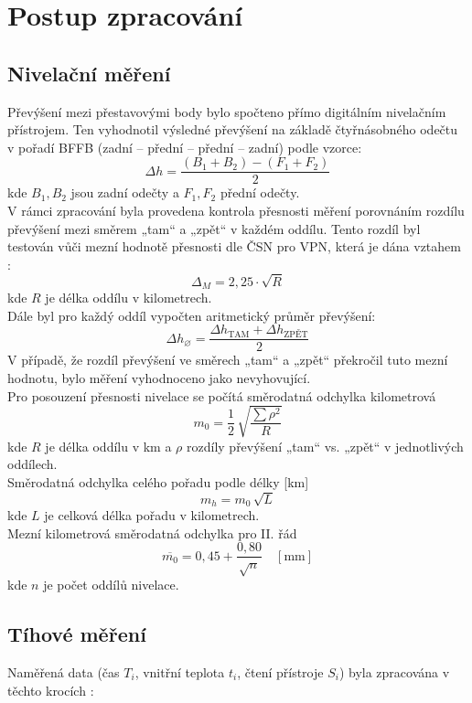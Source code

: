 \section{Postup zpracování}

\subsection{Nivelační měření}

Převýšení mezi přestavovými body bylo spočteno přímo digitálním nivelačním přístrojem. Ten vyhodnotil výsledné převýšení na základě čtyřnásobného odečtu v pořadí BFFB (zadní – přední – přední – zadní) podle vzorce:
\[
\Delta h = \frac{(B_1 + B_2) - (F_1 + F_2)}{2}
\]
kde \( B_1, B_2 \) jsou zadní odečty a \( F_1, F_2 \) přední odečty.\\
V rámci zpracování byla provedena kontrola přesnosti měření porovnáním rozdílu převýšení mezi směrem „tam“ a „zpět“ v každém oddílu. Tento rozdíl byl testován vůči mezní hodnotě přesnosti dle ČSN pro VPN, která je dána vztahem \cite{skorepa}:
\[
\Delta_M = 2,25 \cdot \sqrt{R}
\]
kde \( R \) je délka oddílu v kilometrech.\\
Dále byl pro každý oddíl vypočten aritmetický průměr převýšení:
\[
\Delta h_{\diameter} = \frac{\Delta h_{\text{TAM}} + \Delta h_{\text{ZPĚT}}}{2}
\]
V případě, že rozdíl převýšení ve směrech „tam“ a „zpět“ překročil tuto mezní hodnotu, bylo měření vyhodnoceno jako nevyhovující.\cite{zadani}\\
Pro posouzení přesnosti nivelace se počítá směrodatná odchylka kilometrová
\[
  m_0 = \frac{1}{2}\,\sqrt{\frac{\sum\rho^2}{R}}
\]
kde \( R \) je délka oddílu v km a \(\rho\) rozdíly převýšení „tam“ vs. „zpět“ v jednotlivých oddílech.\\
Směrodatná odchylka celého pořadu podle délky [km]
\[
  m_h = m_0 \,\sqrt{L}
\]
kde \(L\) je celková délka pořadu v kilometrech.\\
Mezní kilometrová směrodatná odchylka pro II. řád
\[
  \overline{m_0} = 0{,}45 + \frac{0{,}80}{\sqrt{n}}\quad [\mathrm{mm}]
\]
kde \(n\) je počet oddílů nivelace.

\subsection{Tíhové měření}

Naměřená data (čas \(T_i\), vnitřní teplota \(t_i\), čtení přístroje \(S_i\)) byla zpracována v těchto krocích \cite{gravi}:

